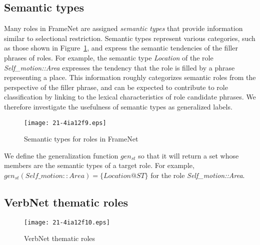\documentclass[english]{jnlp_1.4_rep}
\begin{document}
\subsection{Semantic types}
\label{semanticType}

Many roles in FrameNet are assigned {\it semantic types} that provide information similar to selectional restriction. Semantic types represent various categories, such as those shown in Figure~\ref{fig:semantictype-list}, and express the semantic tendencies of the filler phrases of roles. For example, the semantic type {\it Location} of the role {\it Self\_motion::Area} expresses the tendency that the role is filled by a phrase representing a place. This information roughly categorizes semantic roles from the perspective of the filler phrase, and can be expected to contribute to role classification by linking to the lexical characteristics of role candidate phrases. We therefore investigate the usefulness of semantic types as generalized labels.

\begin{figure}[b]
\begin{center}
\texttt{[image: 21-4ia12f9.eps]}
\end{center}
\caption{Semantic types for roles in FrameNet}
\label{fig:semantictype-list}
\end{figure}

We define the generalization function $gen_{st}$ so that it will return a set whose members are the semantic types of a target role. For example, $gen_{st}(\mathit{Self\_motion::Area})=\{\mathit{Location@ST}\}$ for the role {\it Self\_motion::Area}.


\subsection{VerbNet thematic roles}
\label{sec:frameNet-verbnet}

\begin{figure}[b]
\begin{center}
\texttt{[image: 21-4ia12f10.eps]}
\end{center}
\caption{VerbNet thematic roles}
\label{fig:thematic-role-list}
\end{figure}
\end{document}
